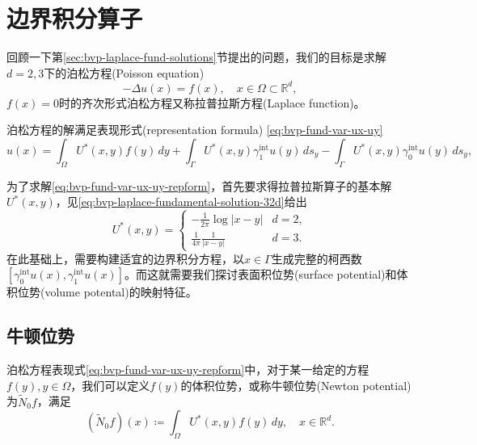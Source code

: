 \section{边界积分算子}
\label{sec:bvp-integral-operators}

回顾一下第\ref{sec:bvp-laplace-fund-solutions}节提出的问题，我们的目标是求解$d=2,3$下的泊松方程(Poisson equation)
\begin{equation*}
  -\Delta u(x) = f(x), \quad x \in \Omega \subset \mathbb{R}^d,
\end{equation*}
$f(x)=0$时的齐次形式泊松方程又称拉普拉斯方程(Laplace function)。

泊松方程的解满足表现形式(representation formula)   \eqref{eq:bvp-fund-var-ux-uy}
\begin{equation}
  \label{eq:bvp-fund-var-ux-uy-repform}
  u(x) = \int_{\Omega} U^{*}(x,y) f(y) \, dy
  + \int_{\Gamma} U^{*}(x,y) \gamma_{1}^{\text{int}} u(y) \, d s_y
  - \int_{\Gamma} U^{*}(x,y) \gamma_{0}^{\text{int}} u(y) \, d s_y,
\end{equation}

为了求解\eqref{eq:bvp-fund-var-ux-uy-repform}，首先要求得拉普拉斯算子的基本解$U^{*}(x,y)$，见\eqref{eq:bvp-laplace-fundamental-solution-32d}给出
\begin{equation*}
  U^{*}(x,y) = \begin{cases}
  - \frac{1}{2 \pi} \log | x - y | & d =2, \\
  \frac{1}{4 \pi} \frac{1}{| x - y |} & d = 3.
  \end{cases}
\end{equation*}
在此基础上，需要构建适宜的边界积分方程，以$x \in \Gamma$生成完整的柯西数$\left[ \gamma_{0}^{\text{int}} u(x),  \gamma_{1}^{\text{int}} u(x)\right]$。而这就需要我们探讨表面积位势(surface potential)和体积位势(volume potental)的映射特征。

\subsection{牛顿位势}
\label{sec:bvp-newton-potential}
泊松方程表现式\eqref{eq:bvp-fund-var-ux-uy-repform}中，对于某一给定的方程$f(y), y \in \Omega$，我们可以定义$f(y)$的体积位势，或称牛顿位势(Newton potential)为$\widetilde{N}_{0} f $，满足
\begin{equation}
  \label{eq:bvp-newton-potential-def}
  \left( \widetilde{N}_{0} f \right) (x) \coloneqq \int_{\Omega} U^{*}(x,y) f(y) \, dy, \quad x \in \mathbb{R}^{d}.
\end{equation}

